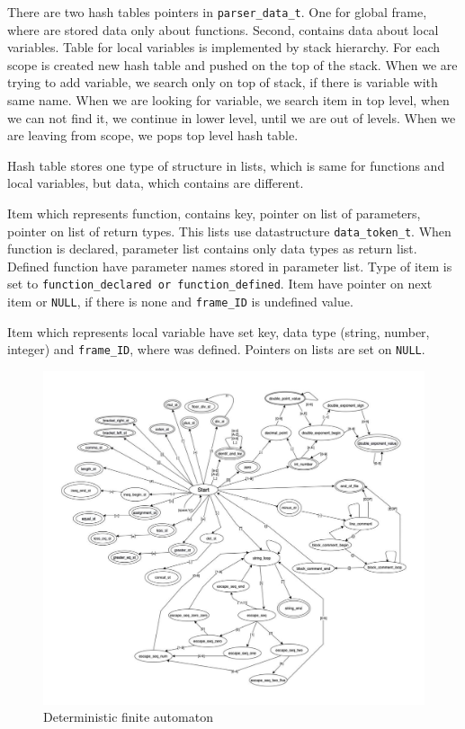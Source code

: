 \documentclass[11pt]{article}
\begin{document}
There are two hash tables pointers in \texttt{parser\_data\_t}. One for global frame, where are stored data only about functions. Second, contains data about local variables. Table for local variables is implemented by
stack hierarchy. For each scope is created new hash table and pushed on the top of the stack. When we are trying to add variable, we search only on top of stack, if there is variable with same name. When we are looking for variable, we search item in top level, 
when we can not find it, we continue in lower level, until we are out of levels. When we are leaving from scope, we pops top level hash table.

Hash table stores one type of structure in lists, which is same for functions and local variables, but data, which contains are different.

Item which represents function, contains key, pointer on list of parameters, pointer on list of return types. This lists use datastructure \texttt{data\_token\_t}. When function
is declared, parameter list contains only data types as return list. Defined function have parameter names stored in parameter list. Type of item is set to \texttt{function\_declared or function\_defined}.
Item have pointer on next item or \texttt{NULL}, if there is none and \texttt{frame\_ID} is undefined value.

Item which represents local variable have set key, data type (string, number, integer) and \texttt{frame\_ID}, where was defined. Pointers on lists are set on \texttt{NULL}.

    \begin{figure}[!ht]
		\centering
		\includegraphics[width=0.95\linewidth]{pics/Konecny_automat.pdf}
		\caption{Deterministic finite automaton}
        \label{figure:pics/Konecny_automat.pdf}
	\end{figure}
\end{document}
